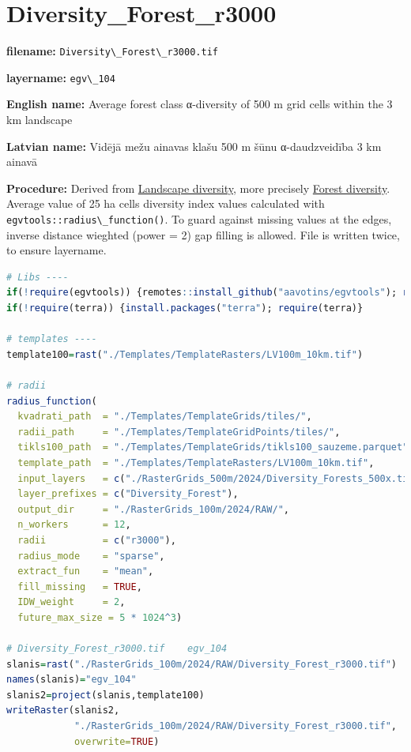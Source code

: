 \documentclass[
]{book}
\newcommand{\passthrough}[1]{#1}
\begin{document}
\section{Diversity\_Forest\_r3000}\label{ch06.104}

\textbf{filename:} \passthrough{\lstinline!Diversity\_Forest\_r3000.tif!}

\textbf{layername:} \passthrough{\lstinline!egv\_104!}

\textbf{English name:} Average forest class α-diversity of 500 m grid cells within the 3 km landscape

\textbf{Latvian name:} Vidējā mežu ainavas klašu 500 m šūnu α-daudzveidība 3 km ainavā

\textbf{Procedure:} Derived from \hyperref[Ch05.04]{Landscape diversity}, more precisely
\hyperref[Ch05.04.02]{Forest diversity}. Average value of 25 ha
cells diversity index values calculated with \passthrough{\lstinline!egvtools::radius\_function()!}. To
guard against missing values at the edges, inverse distance wieghted (power = 2)
gap filling is allowed. File is written twice, to ensure layername.

\begin{lstlisting}[language=R]
# Libs ----
if(!require(egvtools)) {remotes::install_github("aavotins/egvtools"); require(egvtools)}
if(!require(terra)) {install.packages("terra"); require(terra)}

# templates ----
template100=rast("./Templates/TemplateRasters/LV100m_10km.tif")

# radii
radius_function(
  kvadrati_path  = "./Templates/TemplateGrids/tiles/",
  radii_path     = "./Templates/TemplateGridPoints/tiles/",
  tikls100_path  = "./Templates/TemplateGrids/tikls100_sauzeme.parquet",
  template_path  = "./Templates/TemplateRasters/LV100m_10km.tif",
  input_layers   = c("./RasterGrids_500m/2024/Diversity_Forests_500x.tif"),
  layer_prefixes = c("Diversity_Forest"),
  output_dir     = "./RasterGrids_100m/2024/RAW/",
  n_workers      = 12,
  radii          = c("r3000"),
  radius_mode    = "sparse",
  extract_fun    = "mean",
  fill_missing   = TRUE,
  IDW_weight     = 2,
  future_max_size = 5 * 1024^3)

# Diversity_Forest_r3000.tif    egv_104
slanis=rast("./RasterGrids_100m/2024/RAW/Diversity_Forest_r3000.tif")
names(slanis)="egv_104"
slanis2=project(slanis,template100)
writeRaster(slanis2,
            "./RasterGrids_100m/2024/RAW/Diversity_Forest_r3000.tif",
            overwrite=TRUE)
\end{lstlisting}
\end{document}
